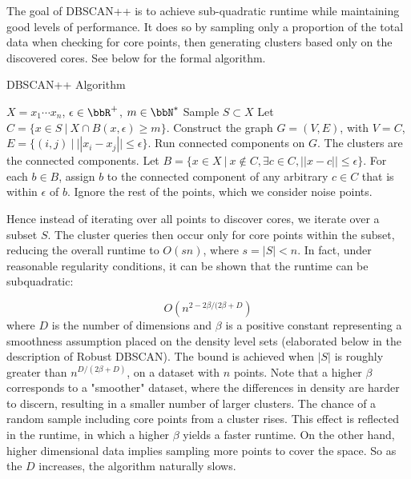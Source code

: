 The goal of DBSCAN++ is to achieve sub-quadratic runtime while maintaining good levels of performance. It does so by sampling only a proportion of the total data when checking for core points, then generating clusters based only on the discovered cores. See below for the formal algorithm.\cite{dbscanpp}

  \begin{algorithm}[H]
    \caption{DBSCAN++ Algorithm}
    \label{dbscan++ alg}
    \begin{algorithmic}[1]
      \renewcommand\algorithmicrequire{\textbf{input}}
      \REQUIRE $X = {x_1\cdots x_n}$, $\epsilon \in \bbR^+$, $m \in \bbN^*$
      \STATE Sample $S \subset X$
      \STATE Let $C=\{x \in S \ | \ X \cap B(x, \epsilon) \geq m\}$.
      \STATE Construct the graph $G=(V,E)$, with $V=C$, $E=\{(i,j) \ | \ ||x_i-x_j|| \leq \epsilon\}$.
      \STATE Run connected components on $G$. The clusters are the connected components.
      \STATE Let $B=\{x \in X \ | \ x \notin C, \exists c \in C, ||x-c|| \leq \epsilon\}$.
      For each $b \in B$, assign $b$ to the connected component of any arbitrary $c \in C$
      that is within $\epsilon$ of $b$.
      \STATE Ignore the rest of the points, which we consider noise points.
    \end{algorithmic}
  \end{algorithm}
  
Hence instead of iterating over all points to discover cores, we iterate over a subset $S$. The cluster queries then occur only for core points within the subset, reducing the overall runtime to $O(sn)$, where $s = |S| < n$. In fact, under reasonable regularity conditions, it can be shown that the runtime can be subquadratic:

$$ O(n^{2 - 2\beta / (2\beta + D})$$
where $D$ is the number of dimensions and $\beta$ is a positive constant representing a smoothness assumption placed on the density level sets (elaborated below in the description of Robust DBSCAN). The bound is achieved when $|S|$ is roughly greater than $n^{D / (2\beta + D)}$, on a dataset with $n$ points. Note that a higher $\beta$ corresponds to a "smoother" dataset, where the differences in density are harder to discern, resulting in a smaller number of larger clusters. The chance of a random sample including core points from a cluster rises. This effect is reflected in the runtime, in which a higher $\beta$ yields a faster runtime. On the other hand, higher dimensional data implies sampling more points to cover the space. So as the $D$ increases, the algorithm naturally slows.


